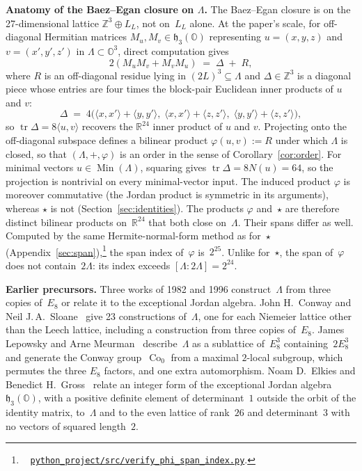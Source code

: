 \documentclass[twoside,english]{paper}
\numberwithin{equation}{section}
\numberwithin{figure}{section}
\theoremstyle{definition}
\theoremstyle{remark}
\newcommand{\OO}{\mathbb{O}}          %
\newcommand{\RR}{\mathbb{R}}
\newcommand{\ZZ}{\mathbb{Z}}
\newcommand{\LL}{\Lambda}             %
\newcommand{\Nrm}{N}                  %
\DeclareMathOperator{\Co}{Co}
\newcommand{\scriptref}[1]{\cite{repo}~%
  \href{https://github.com/koeplinger/leech\_alg/blob/main/python\_project/src/#1}%
  {\nolinkurl{python_project/src/#1}}}
\begin{document}
\textbf{Anatomy of the Baez--Egan closure on $\LL$.}  The
Baez--Egan closure is on the 27-dimensional lattice
$\ZZ^3 \oplus L_L$, not on~$L_L$ alone.  At the paper's scale, for
off-diagonal Hermitian matrices $M_u, M_v \in \mathfrak{h}_3(\OO)$
representing $u = (x,y,z)$ and $v = (x',y',z')$ in $\LL \subset \OO^3$,
direct computation gives
\begin{equation}\label{eq:disp11}
  2(M_u M_v + M_v M_u) \;=\; \Delta \;+\; R,
\end{equation}
where $R$ is an off-diagonal residue lying in $(2L)^3 \subseteq \LL$
and $\Delta \in \ZZ^3$ is a diagonal piece whose entries are four times the
block-pair Euclidean inner products of $u$ and $v$:
\begin{equation}\label{eq:disp12}
  \Delta \;=\; 4\bigl(\langle x, x'\rangle + \langle y, y'\rangle,\;
                  \langle x, x'\rangle + \langle z, z'\rangle,\;
                  \langle y, y'\rangle + \langle z, z'\rangle\bigr),
\end{equation}
so $\operatorname{tr} \Delta = 8 \langle u, v\rangle$ recovers the
$\RR^{24}$ inner product of $u$ and $v$.  Projecting onto the
off-diagonal subspace defines a bilinear product $\varphi(u, v) := R$
under which $\LL$ is closed, so that $(\LL, +, \varphi)$ is an order
in the sense of Corollary~\ref{cor:order}.  For minimal vectors
$u \in \operatorname{Min}(\LL)$, squaring gives
$\operatorname{tr} \Delta = 8\Nrm(u) = 64$, so the projection is
nontrivial on every minimal-vector input.  The induced product
$\varphi$ is moreover commutative (the Jordan product is symmetric
in its arguments), whereas $\star$ is not
(Section~\ref{sec:identities}).  The products $\varphi$ and~$\star$
are therefore distinct bilinear products on~$\RR^{24}$ that both close
on~$\LL$.  Their spans differ as well.  Computed by the same
Hermite-normal-form method as for~$\star$
(Appendix~\ref{sec:span}),\footnote{\scriptref{verify\_phi\_span\_index.py}.}
the span index of~$\varphi$ is~$2^{25}$.  Unlike for~$\star$, the span
of~$\varphi$ does not contain~$2\LL$: its index exceeds
$[\LL : 2\LL] = 2^{24}$.

\textbf{Earlier precursors.}  Three works of 1982 and 1996
construct~$\LL$ from three copies of~$E_8$ or relate it to the
exceptional Jordan algebra.
John H.~Conway and Neil J.\,A.~Sloane~\cite{ConwaySloane1982} give 23
constructions of~$\LL$, one for each Niemeier lattice other than the
Leech lattice, including a construction from three copies of~$E_8$.  James Lepowsky
and Arne Meurman~\cite{LepowskyMeurman1982} describe~$\LL$ as a
sublattice of~$E_8^3$ containing~$2 E_8^3$ and generate the Conway
group~$\Co_0$ from a maximal $2$-local subgroup, which permutes the
three $E_8$ factors, and one extra automorphism.  Noam D.~Elkies and
Benedict H.~Gross~\cite{ElkiesGross1996} relate an integer form of the
exceptional Jordan algebra $\mathfrak{h}_3(\OO)$, with a positive
definite element of determinant~$1$ outside the orbit of the identity
matrix, to~$\LL$ and to the even lattice of rank~$26$ and
determinant~$3$ with no vectors of squared length~$2$.
\end{document}
